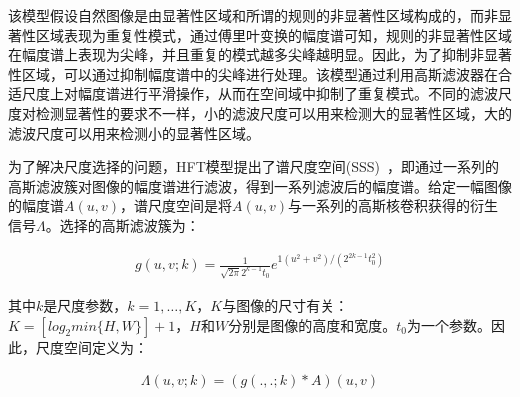 该模型假设自然图像是由显著性区域和所谓的规则的非显著性区域构成的，而非显著性区域表现为重复性模式，通过傅里叶变换的幅度谱可知，规则的非显著性区域在幅度谱上表现为尖峰，并且重复的模式越多尖峰越明显。因此，为了抑制非显著性区域，可以通过抑制幅度谱中的尖峰进行处理。该模型通过利用高斯滤波器在合适尺度上对幅度谱进行平滑操作，从而在空间域中抑制了重复模式。不同的滤波尺度对检测显著性的要求不一样，小的滤波尺度可以用来检测大的显著性区域，大的滤波尺度可以用来检测小的显著性区域。

为了解决尺度选择的问题，HFT模型提出了谱尺度空间(SSS)~\cite{LiJianTPAMI2013Scale}，即通过一系列的高斯滤波簇对图像的幅度谱进行滤波，得到一系列滤波后的幅度谱。给定一幅图像的幅度谱$A(u,v)$，谱尺度空间是将$A(u,v)$与一系列的高斯核卷积获得的衍生信号$\Lambda$。选择的高斯滤波簇为：
\begin{linenomath}
\begin{align}
g(u,v;k)=\frac{1}{\sqrt{2\pi}2^{k-1}t_{0}}e^{1(u^2+v^2)/(2^{2k-1}t_{0}^{2})}
\label{式3_32}
\end{align}
\end{linenomath}
其中$k$是尺度参数，$k=1,\dots,K$，$K$与图像的尺寸有关：$K=[log_{2}min\{H,W\}]+1$，$H$和$W$分别是图像的高度和宽度。$t_{0}$为一个参数。因此，尺度空间定义为：
\begin{linenomath}
\begin{align}
\Lambda(u,v;k)=(g(.,.;k)\ast A)(u,v)
\label{式3_33}
\end{align}
\end{linenomath}

